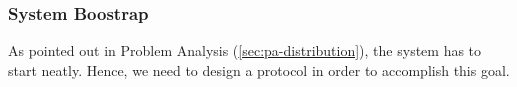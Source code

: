 



\subsubsection{System Boostrap}
As pointed out in Problem Analysis (\ref{sec:pa-distribution}), the system has
to start neatly. Hence, we need to design a protocol in order to accomplish
this goal.

